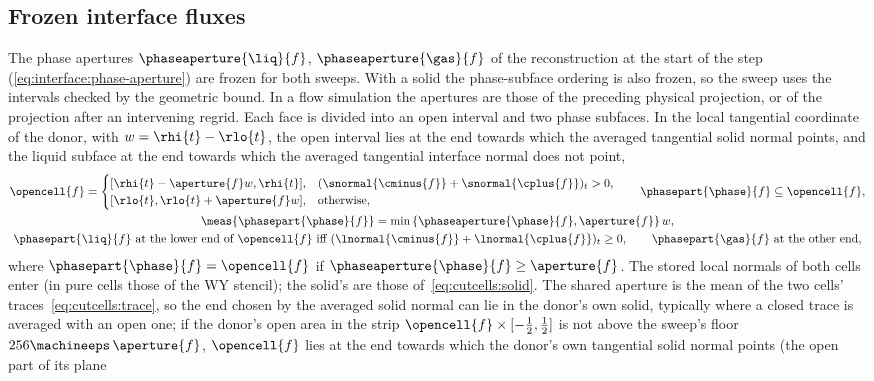 \subsection{Frozen interface fluxes}\label{sec:vof:frozen}
The phase apertures $\phaseaperture{\liq}{f}$, $\phaseaperture{\gas}{f}$ of the
reconstruction at the start of the step
(\cref{eq:interface:phase-aperture}) are frozen for both sweeps. With a solid
the phase-subface ordering is also frozen, so the sweep uses the intervals
checked by the geometric bound. In a flow simulation the apertures are those
of the preceding physical projection, or of the projection after an
intervening regrid. Each face is divided into an open interval and two phase
subfaces. In the local tangential coordinate of the donor, with
$w=\rhi{t}-\rlo{t}$, the open interval lies at the end towards which the
averaged tangential solid normal points, and the liquid subface at the end
towards which the averaged tangential interface normal does not point,
\begin{equation}\label{eq:vof:subface}
  \begin{gathered}
  \opencell{f}=\begin{cases}[\rhi{t}-\aperture{f}w,\rhi{t}], & (\snormal{\cminus{f}}+\snormal{\cplus{f}})_t>0,\\
    [\rlo{t},\rlo{t}+\aperture{f}w], & \text{otherwise},\end{cases}
  \qquad
  \phasepart{\phase}{f}\subseteq\opencell{f},\\
  \meas{\phasepart{\phase}{f}}=\min\curlypar{\phaseaperture{\phase}{f},\aperture{f}}w,\\
  \phasepart{\liq}{f}\text{ at the lower end of }\opencell{f}\text{ iff }(\lnormal{\cminus{f}}+\lnormal{\cplus{f}})_t\ge0,
  \qquad\phasepart{\gas}{f}\text{ at the other end},
  \end{gathered}
\end{equation}
where $\phasepart{\phase}{f}=\opencell{f}$ if
$\phaseaperture{\phase}{f}\ge\aperture{f}$. The stored local normals of both
cells enter (in pure cells those of the WY stencil); the solid's are those
of~\cref{eq:cutcells:solid}. The shared aperture is the mean of the two
cells' traces~\cref{eq:cutcells:trace}, so the end chosen by the averaged
solid normal can lie in the donor's own solid, typically where a closed trace
is averaged with an open one; if the donor's open area in the strip
$\opencell{f}\times[-\frac12,\frac12]$ is not above the sweep's floor
$256\machineeps\,\aperture{f}$, $\opencell{f}$ lies at the end towards which the
donor's own tangential solid normal points (the open part of its plane
